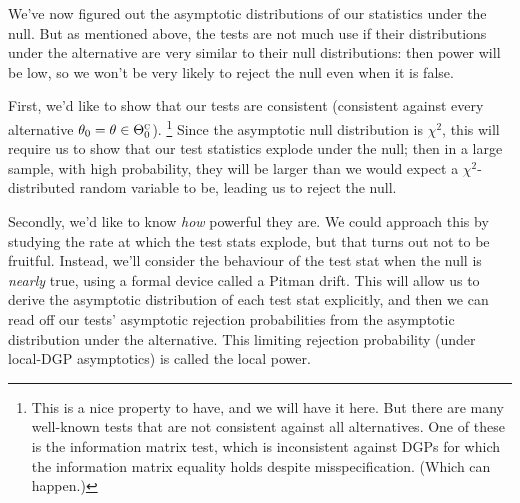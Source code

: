 \documentclass[11pt,letterpaper,reqno,oneside]{article}
\begin{document}
We've now figured out the asymptotic distributions of our statistics under the null. But as mentioned above, the tests are not much use if their distributions under the alternative are very similar to their null distributions: then power will be low, so we won't be very likely to reject the null even when it is false.

First, we'd like to show that our tests are consistent (consistent against every alternative $\theta_0 = \theta \in \Theta_0^{\textsc{c}}$).%
	\footnote{This is a nice property to have, and we will have it here. But there are many well-known tests that are not consistent against all alternatives. One of these is the information matrix test, which is inconsistent against DGPs for which the information matrix equality holds despite misspecification. (Which can happen.)}
Since the asymptotic null distribution is $\chi^2$, this will require us to show that our test statistics explode under the null; then in a large sample, with high probability, they will be larger than we would expect a $\chi^2$-distributed random variable to be, leading us to reject the null.

Secondly, we'd like to know \emph{how} powerful they are. We could approach this by studying the rate at which the test stats explode, but that turns out not to be fruitful. Instead, we'll consider the behaviour of the test stat when the null is \emph{nearly} true, using a formal device called a Pitman drift. This will allow us to derive the asymptotic distribution of each test stat explicitly, and then we can read off our tests' asymptotic rejection probabilities from the asymptotic distribution under the alternative. This limiting rejection probability (under local-DGP asymptotics) is called the local power.
\end{document}
